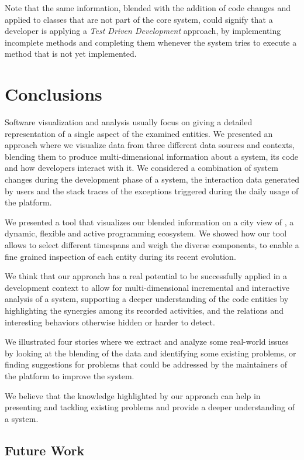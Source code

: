 Note that the same information, blended with the addition of code changes and applied to classes that are not part of the core system, could signify that a developer is applying a \textit{Test Driven Development} approach, by implementing incomplete methods and completing them whenever the system tries to execute a method that is not yet implemented.



\section{Conclusions}\label{sec:conclusions}

Software visualization and analysis usually focus on giving a detailed representation of a single aspect of the examined entities.
We presented an approach where we visualize data from three different data sources and contexts, blending them to produce multi-dimensional information about a system, its code and how developers interact with it.
We considered a combination of system changes during the development phase of a system, the interaction data generated by users and the stack traces of the exceptions triggered during the daily usage of the platform.

We presented a tool that visualizes our blended information on a city view of \pha, a dynamic, flexible and active programming ecosystem.
We showed how our tool allows to select different timespans and weigh the diverse components, to enable a fine grained inspection of each entity during its recent evolution.

We think that our approach has a real potential to be successfully applied in a development context to allow for multi-dimensional incremental and interactive analysis of a system, supporting a deeper understanding of the code entities by highlighting the synergies among its recorded activities, and the relations and interesting behaviors otherwise hidden or harder to detect.

We illustrated four stories where we extract and analyze some real-world issues by looking at the blending of the data and identifying some existing problems, or finding suggestions for problems that could be addressed by the maintainers of the platform to improve the system.

We believe that the knowledge highlighted by our approach can help in presenting and tackling existing problems and provide a deeper understanding of a system.

\subsection*{Future Work}

